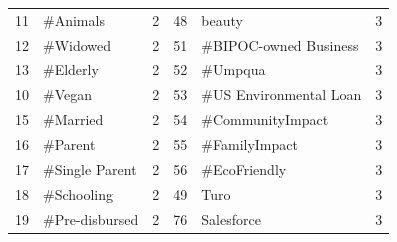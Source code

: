 \begin{longtable}{|r|l|l|r|l|l|}
	11                                & \#Animals                          & 2                                                  & 48                               & beauty                              & 3                                          \\
	12                                & \#Widowed                          & 2                                                  & 51                               & \#BIPOC-owned Business              & 3                                          \\
	13                                & \#Elderly                          & 2                                                  & 52                               & \#Umpqua                            & 3                                          \\
	10                                & \#Vegan                            & 2                                                  & 53                               & \#US Environmental Loan             & 3                                          \\
	15                                & \#Married                          & 2                                                  & 54                               & \#CommunityImpact                   & 3                                          \\
	16                                & \#Parent                           & 2                                                  & 55                               & \#FamilyImpact                      & 3                                          \\
	17                                & \#Single Parent                    & 2                                                  & 56                               & \#EcoFriendly                       & 3                                          \\
	18                                & \#Schooling                        & 2                                                  & 49                               & Turo                                & 3                                          \\
	19                                & \#Pre-disbursed                    & 2                                                  & 76                               & Salesforce                          & 3                                          \\
\end{longtable}



